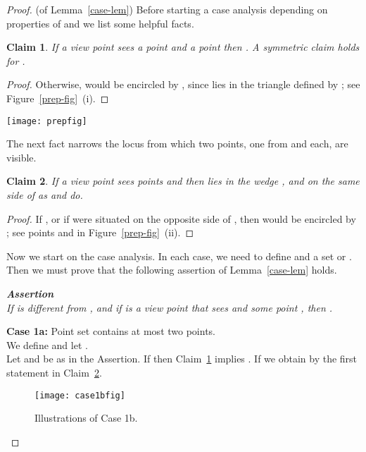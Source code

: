 \documentclass[11pt]{article}
\newtheorem{claim}{Claim}
\begin{document}
\begin{proof} (of Lemma~\ref{case-lem}) Before starting a case analysis depending on properties of
 and  we list some helpful facts.

\begin{claim}         \label{prep1-claim}
If a view point  sees a point  and a point  then
. A symmetric claim holds for .
\end{claim}
\begin{proof}
Otherwise,  would be encircled by , 
since  lies in the triangle defined by ; see Figure~\ref{prep-fig}~(i).
\end{proof}
\begin{figure*}[hbtp]\begin{center}\texttt{[image: prepfig]}\caption{Illustration to Claims~\ref{prep1-claim} and~\ref{prep2-claim}.}\label{prep-fig}
  \end{center}\end{figure*}
The next fact narrows the locus from which two points, one from  and  each,
are visible. 
\begin{claim}         \label{prep2-claim}
If a view point  sees points  and  then
 lies in the wedge , and on the same side of 
as  and  do.
\end{claim}
\begin{proof}
If , or if  were situated on the opposite side of , 
then  would be encircled by ; see points  and  
in Figure~\ref{prep-fig}~(ii).
\end{proof}

Now we start on the case analysis. In each case, we need to define  and 
a set  or .
Then we must prove that the following assertion of Lemma~\ref{case-lem} holds.

{\em {\bf Assertion}\\
 If  is different from , and if  is a view point that sees  and
some  point , then .}

{\bf Case 1a:} Point set  contains at most two points.\\
We define  and let .\\
Let  and  be as in the Assertion.
If  then Claim~\ref{prep1-claim} implies . 
If  we obtain   by the first statement in Claim~\ref{prep2-claim}.
\begin{figure}[hbtp]\begin{center}\texttt{[image: case1bfig]}\caption{Illustrations of Case 1b.}\label{case1b-fig}
  \end{center}\end{figure}



\end{proof}
\end{document}
